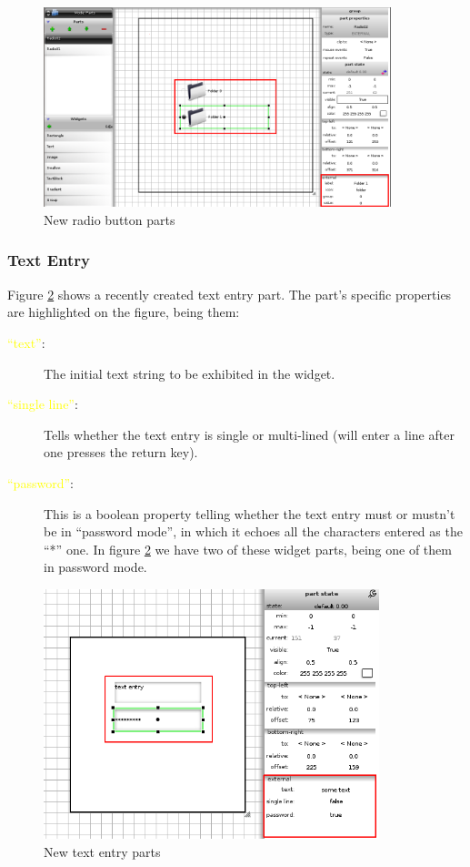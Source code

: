\documentclass[a4paper]{profusion}
\newcommand{\GUIEditable}[1]{\textcolor{yellow}{#1}} %
\begin{document}
\begin{figure}[h!]
  \centering
  \includegraphics[width=0.9\textwidth]{images/new_radio.png}
  \caption{New radio button parts}
  \label{fig:new_radio}
\end{figure}

\subsubsection{Text Entry}

Figure \ref{fig:new_entry} shows a recently created text entry
part. The part's specific properties are highlighted on the figure,
being them:

\begin{description}
  \item[\GUIEditable{``text''}:] The initial text string to be
    exhibited in the widget.
  \item[\GUIEditable{``single line''}:] Tells whether the text entry
    is single or multi-lined (will enter a line after one presses the
    return key).
  \item[\GUIEditable{``password''}:] This is a boolean property
    telling whether the text entry must or mustn't be in ``password
    mode'', in which it echoes all the characters entered as the ``*''
    one. In figure \ref{fig:new_entry} we have two of these widget
    parts, being one of them in password mode.
\end{description}

\begin{figure}[h!]
  \centering
  \includegraphics[width=0.87\textwidth]{images/new_entry.png}
  \caption{New text entry parts}
  \label{fig:new_entry}
\end{figure}
\end{document}
